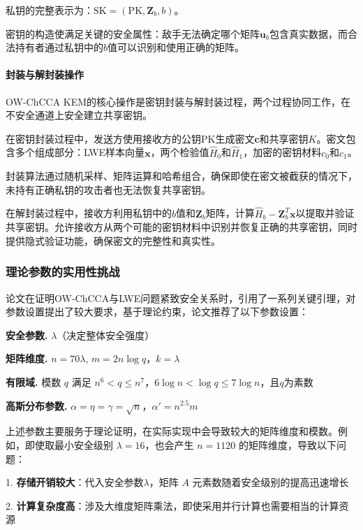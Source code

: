 私钥的完整表示为：$\mathrm{SK} = (\mathrm{PK}, \mathbf{Z}_b, b)$。

密钥的构造使满足关键的安全属性：敌手无法确定哪个矩阵$\mathbf{u}_b$包含真实数据，而合法持有者通过私钥中的$b$值可以识别和使用正确的矩阵。

\paragraph{封装与解封装操作}

OW-ChCCA KEM的核心操作是密钥封装与解封装过程，两个过程协同工作，在不安全通道上安全建立共享密钥。

在密钥封装过程中，发送方使用接收方的公钥$\mathrm{PK}$生成密文$\mathbf{c}$和共享密钥$K$。密文包含多个组成部分：LWE样本向量$\mathbf{x}$，两个检验值$\hat{H}_0$和$\hat{H}_1$，加密的密钥材料$c_0$和$c_1$。

封装算法通过随机采样、矩阵运算和哈希组合，确保即使在密文被截获的情况下，未持有正确私钥的攻击者也无法恢复共享密钥。

在解封装过程中，接收方利用私钥中的$b$值和$\mathbf{Z}_b$矩阵，计算$\hat{H}_b - \mathbf{Z}_b^T\mathbf{x}$以提取并验证共享密钥。允许接收方从两个可能的密钥材料中识别并恢复正确的共享密钥，同时提供隐式验证功能，确保密文的完整性和真实性。

\subsubsection{理论参数的实用性挑战}

论文\cite{pan_lattice-based_2023}在证明OW-ChCCA与LWE问题紧致安全关系时，引用了一系列关键引理，对参数设置提出了较大要求，基于理论约束，论文推荐了以下参数设置：

\textbf{安全参数.} $\lambda$（决定整体安全强度）

\textbf{矩阵维度.} $n = 70\lambda$, $m = 2n\log q$，$k = \lambda$

\textbf{有限域.} 模数 $q$ 满足 $n^6 < q \leq n^7$，$6\log n< \log q \leq 7\log n$，且$q$为素数

\textbf{高斯分布参数.} $\alpha = \eta = \gamma = \sqrt{n}$，$\alpha' = n^{2.5}m$

上述参数主要服务于理论证明，在实际实现中会导致较大的矩阵维度和模数。例如，即使取最小安全级别 $\lambda = 16$，也会产生 $n = 1120$ 的矩阵维度，导致以下问题：

1. \textbf{存储开销较大}：代入安全参数$\lambda$，矩阵 $A$ 元素数随着安全级别的提高迅速增长

2. \textbf{计算复杂度高}：涉及大维度矩阵乘法，即使采用并行计算也需要相当的计算资源

